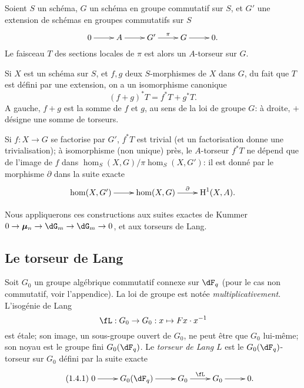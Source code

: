 \subsection{}\label{VI:1-3}

Soient $S$ un schéma, $G$ un schéma en groupe commutatif sur $S$, et $G'$ 
une extension de schémas en groupes commutatifs sur $S$
\[\xymatrix{
  0 \ar[r] 
    & A \ar[r] 
    & G' \ar[r]^-\pi 
    & G \ar[r] 
    & 0 \text{.}
}\]
Le faisceau $T$ des sections locales de $\pi$ est alors un $A$-torseur sur 
$G$. 

Si $X$ est un schéma sur $S$, et $f,g$ deux $S$-morphismes de $X$ dans $G$, 
du fait que $T$ est défini par une extension, on a un isomorphisme 
canonique 
\begin{equation*}\tag{1.3.1}\label{VI:eq:1-3-1}
  (f+g)^\ast T = f^\ast T + g^\ast T \text{.}
\end{equation*}
A gauche, $f+g$ est la somme de $f$ et $g$, au sens de la loi de groupe $G$: 
à droite, $+$ désigne une somme de torseurs. 

Si $f:X\to G$ se factorise par $G'$, $f^\ast T$ est trivial (et un 
factorisation donne une trivialisation); à isomorphisme (non unique) près, 
le $A$-torseur $f^\ast T$ ne dépend que de l'image de $f$ dans 
$\hom_S(X,G)/\pi\hom_S(X,G')$: il est donné par le morphisme $\partial$ dans 
la suite exacte 
\[\xymatrix{
  \hom(X,G') \ar[r] 
    & \hom(X,G) \ar[r]^-\partial 
    & \h^1(X,A) \text{.}
}\]

Nous appliquerons ces constructions aux suites exactes de Kummer 
$0 \to \dmu_n \to \dG_m \to \dG_m \to 0$, et aux torseurs de Lang. 





\subsection{Le torseur de Lang}\label{VI:1-4}

Soit $G_0$ un groupe algébrique commutatif connexe sur $\dF_q$ (pour le cas 
non commutatif, voir l'appendice). La loi de groupe est notée 
\emph{multiplicativement}. L'isogénie de Lang 
\[
\fL:G_0 \to G_0: x\mapsto F x\cdot x^{-1}
\]
est étale; son image, un sous-groupe ouvert de $G_0$, ne peut être que 
$G_0$ lui-même; son noyau est le groupe fini $G_0(\dF_q)$. Le \emph{torseur 
de Lang} $L$ est le $G_0(\dF_q)$-torseur sur $G_0$ défini par la suite 
exacte 
\begin{equation*}\tag{1.4.1}\label{VI:eq:1-4-1}
\xymatrix{
  0 \ar[r] 
    & G_0(\dF_q) \ar[r] 
    & G_0 \ar[r]^-\fL 
    & G_0 \ar[r] 
    & 0 \text{.}
}
\end{equation*}


